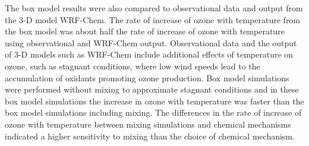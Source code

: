 The box model results were also compared to observational data and output from the 3-D model WRF-Chem.
The rate of increase of ozone with temperature from the box model was about half the rate of increase of ozone with temperature using observational and WRF-Chem output.
Observational data and the output of 3-D models such as WRF-Chem include additional effects of temperature on ozone, such as stagnant conditions, where low wind speeds lead to the accumulation of oxidants promoting ozone production.
Box model simulations were performed without mixing to approximate stagnant conditions and in these box model simulations the increase in ozone with temperature was faster than the box model simulations including mixing.
The differences in the rate of increase of ozone with temperature between mixing simulations and chemical mechanisms indicated a higher sensitivity to mixing than the choice of chemical mechanism.
